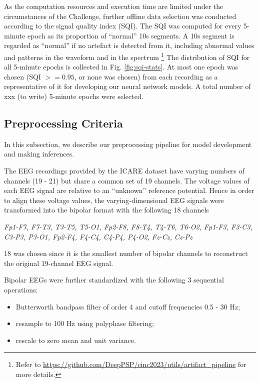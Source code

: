 As the computation resources and execution time are limited under the circumstances of the Challenge, further offline data selection was conducted according to the signal quality index (SQI). The SQI was computed for every 5-minute epoch as its proportion of ``normal'' 10s segments. A 10s segment is regarded as ``normal'' if no artefact is detected from it, including abnormal values and patterns in the waveform and in the spectrum \footnote{Refer to \url{https://github.com/DeepPSP/cinc2023/utils/artifact_pipeline} for more details.} The distribution of SQI for all 5-minute epochs is collected in Fig. \ref{fig:sqi-stats}. At most one epoch was chosen (SQI $>= 0.95$, or none was chosen) from each recording as a representative of it for developing our neural network models. A total number of xxx (to write) 5-minute epochs were selected.


\subsection{Preprocessing Criteria}
\label{subsec:data_preproc}

In this subsection, we describe our preprocessing pipeline for model development and making inferences.

The EEG recordings provided by the ICARE dataset have varying numbers of channels (19 - 21) but share a common set of 19 channels. The voltage values of each EEG signal are relative to an ``unknown'' reference potential. Hence in order to align these voltage values, the varying-dimensional EEG signals were transformed into the bipolar format with the following 18 channels
\begin{indentedquote}{0.3in}
\it Fp1-F7, F7-T3, T3-T5, T5-O1, Fp2-F8, F8-T4, T4-T6, T6-O2, Fp1-F3, F3-C3, C3-P3, P3-O1, Fp2-F4, F4-C4, C4-P4, P4-O2, Fz-Cz, Cz-Pz
\end{indentedquote}
18 was chosen since it is the smallest number of bipolar channels to reconstruct the original 19-channel EEG signal.

Bipolar EEGs were further standardized with the following 3 sequential operations:
\begin{itemize}
    \item Butterworth bandpass filter of order 4 and cutoff frequencies 0.5 - 30 Hz;
    \item resample to 100 Hz using polyphase filtering;
    \item rescale to zero mean and unit variance.
\end{itemize}


